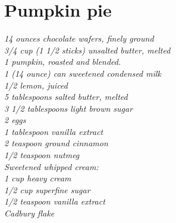 \documentclass{tufte-book}
\begin{document}
\section{Pumpkin pie}

\emph{14 ounces chocolate wafers, finely ground
\\3/4 cup (1 1/2 sticks) unsalted butter, melted
\\1 pumpkin, roasted and blended.
\\1 (14 ounce) can sweetened condensed milk
\\1/2 lemon, juiced
\\5 tablespoons salted butter, melted
\\3 1/2 tablespoons light brown sugar
\\2 eggs
\\1 tablespoon vanilla extract
\\2 teaspoon ground cinnamon
\\1/2 teaspoon nutmeg
\\Sweetened whipped cream:
\\1 cup heavy cream
\\1/2 cup superfine sugar
\\1/2 teaspoon vanilla extract
\\Cadbury flake
}
\end{document}
